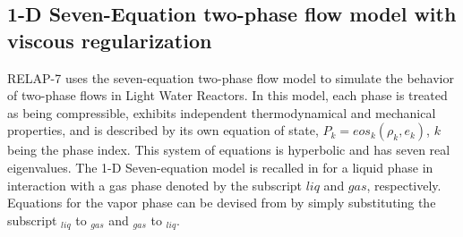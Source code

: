 \documentclass{mc2015}
\begin{document}
\subsection{1-D Seven-Equation two-phase flow model with viscous regularization}\label{sec:two-phase-model}
%
RELAP-7 uses the seven-equation two-phase flow model \cite{SEM} to simulate the behavior of two-phase flows in Light Water Reactors. In this model, each phase is treated as being compressible, exhibits independent thermodynamical and mechanical properties, and is described by its own equation of state, $P_k = eos_k(\rho_k,e_k)$, $k$ being the phase index. This system of equations is hyperbolic and has seven real eigenvalues. The 1-D Seven-equation model is recalled in  for a liquid phase in interaction with a gas phase denoted by the subscript $liq$ and $gas$, respectively. Equations for the vapor phase can be devised from  by simply substituting the subscript $_{liq}$ to $_{gas}$ and $_{gas}$ to $_{liq}$.
%
%
\end{document}
